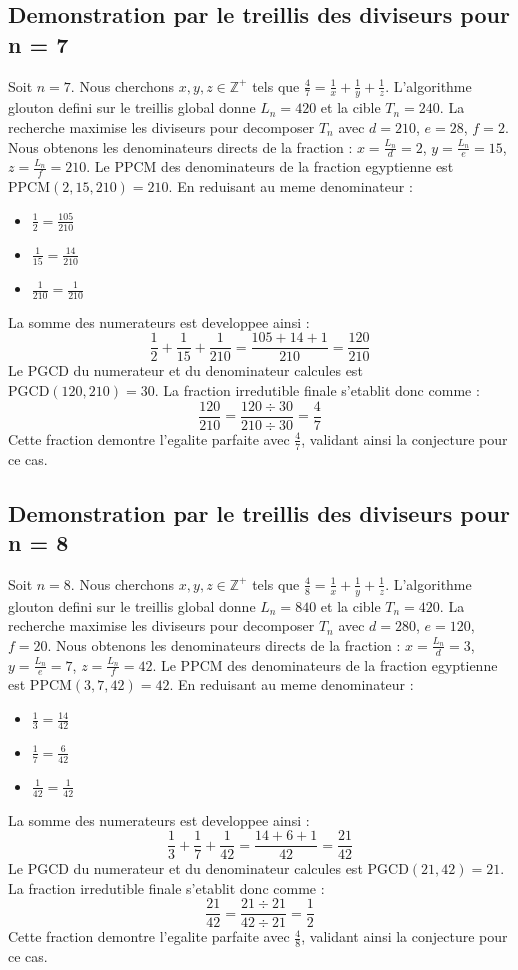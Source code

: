 \documentclass[11pt,a4paper]{article}
\begin{document}
\subsection{Demonstration par le treillis des diviseurs pour n = 7}
Soit $n = 7$. Nous cherchons $x, y, z \in \mathbb{Z}^{+}$ tels que $\frac{4}{7} = \frac{1}{x} + \frac{1}{y} + \frac{1}{z}$.
L'algorithme glouton defini sur le treillis global donne $L_n = 420$ et la cible $T_n = 240$.
La recherche maximise les diviseurs pour decomposer $T_n$ avec $d = 210$, $e = 28$, $f = 2$.
Nous obtenons les denominateurs directs de la fraction : $x = \frac{L_n}{d} = 2$, $y = \frac{L_n}{e} = 15$, $z = \frac{L_n}{f} = 210$.
Le PPCM des denominateurs de la fraction egyptienne est $\text{PPCM}(2, 15, 210) = 210$.
En reduisant au meme denominateur :
\begin{itemize}
    \item $\frac{1}{2} = \frac{105}{210}$
    \item $\frac{1}{15} = \frac{14}{210}$
    \item $\frac{1}{210} = \frac{1}{210}$
\end{itemize}
La somme des numerateurs est developpee ainsi :
$$ \frac{1}{2} + \frac{1}{15} + \frac{1}{210} = \frac{105 + 14 + 1}{210} = \frac{120}{210} $$
Le PGCD du numerateur et du denominateur calcules est $\text{PGCD}(120, 210) = 30$.
La fraction irredutible finale s'etablit donc comme :
$$ \frac{120}{210} = \frac{120 \div 30}{210 \div 30} = \frac{4}{7} $$
Cette fraction demontre l'egalite parfaite avec $\frac{4}{7}$, validant ainsi la conjecture pour ce cas.

\subsection{Demonstration par le treillis des diviseurs pour n = 8}
Soit $n = 8$. Nous cherchons $x, y, z \in \mathbb{Z}^{+}$ tels que $\frac{4}{8} = \frac{1}{x} + \frac{1}{y} + \frac{1}{z}$.
L'algorithme glouton defini sur le treillis global donne $L_n = 840$ et la cible $T_n = 420$.
La recherche maximise les diviseurs pour decomposer $T_n$ avec $d = 280$, $e = 120$, $f = 20$.
Nous obtenons les denominateurs directs de la fraction : $x = \frac{L_n}{d} = 3$, $y = \frac{L_n}{e} = 7$, $z = \frac{L_n}{f} = 42$.
Le PPCM des denominateurs de la fraction egyptienne est $\text{PPCM}(3, 7, 42) = 42$.
En reduisant au meme denominateur :
\begin{itemize}
    \item $\frac{1}{3} = \frac{14}{42}$
    \item $\frac{1}{7} = \frac{6}{42}$
    \item $\frac{1}{42} = \frac{1}{42}$
\end{itemize}
La somme des numerateurs est developpee ainsi :
$$ \frac{1}{3} + \frac{1}{7} + \frac{1}{42} = \frac{14 + 6 + 1}{42} = \frac{21}{42} $$
Le PGCD du numerateur et du denominateur calcules est $\text{PGCD}(21, 42) = 21$.
La fraction irredutible finale s'etablit donc comme :
$$ \frac{21}{42} = \frac{21 \div 21}{42 \div 21} = \frac{1}{2} $$
Cette fraction demontre l'egalite parfaite avec $\frac{4}{8}$, validant ainsi la conjecture pour ce cas.
\end{document}
